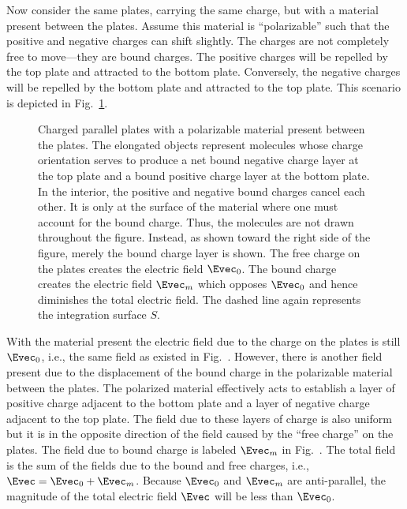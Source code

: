 Now consider the same plates, carrying the same charge, but with a
material present between the plates.  Assume this material is
``polarizable'' such that the positive and negative charges can shift
slightly.  The charges are not completely free to move---they are
bound charges.  The positive charges will be repelled by the top plate
and attracted to the bottom plate.  Conversely, the negative charges
will be repelled by the bottom plate and attracted to the top plate.
This scenario is depicted in Fig.\ \ref{fig:platesMat}.
\begin{figure}
  \begin{center}
  \end{center} \caption{Charged parallel plates with a polarizable
  material present between the plates.  The elongated objects
  represent molecules whose charge orientation serves to produce a net
  bound negative charge layer at the top plate and a bound positive
  charge layer at the bottom plate.  In the interior, the positive and
  negative bound charges cancel each other.  It is only at the surface
  of the material where one must account for the bound charge.  Thus,
  the molecules are not drawn throughout the figure.  Instead, as
  shown toward the right side of the figure, merely the bound charge
  layer is shown.  The free charge on the plates creates the electric
  field $\Evec_0$.  The bound charge creates the electric field
  $\Evec_m$ which opposes $\Evec_0$ and hence diminishes the total
  electric field. The dashed line again represents the integration
  surface $S$.}  \label{fig:platesMat}
\end{figure}

With the material present the electric field due to the charge on the
plates is still $\Evec_0$, i.e., the same field as existed in Fig.\
.  However, there is another field present due
to the displacement of the bound charge in the polarizable material
between the plates.  The polarized material effectively acts to
establish a layer of positive charge adjacent to the bottom plate and
a layer of negative charge adjacent to the top plate.  The field due
to these layers of charge is also uniform but it is in the opposite
direction of the field caused by the ``free charge'' on the plates.
The field due to bound charge is labeled $\Evec_m$ in Fig.\
.  The total field is the sum of the fields due
to the bound and free charges, i.e., $\Evec = \Evec_0 + \Evec_m$.
Because $\Evec_0$ and $\Evec_m$ are anti-parallel, the magnitude of
the total electric field $\Evec$ will be less than $\Evec_0$.

